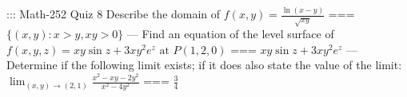 ::: Math-252 Quiz 8
Describe the domain of
\(f(x,y)=\frac{\ln(x-y)}{\sqrt{xy}}\)
===
\(\{(x,y):x>y,xy>0\}\)
---
Find an equation of the level surface of
\(f(x,y,z)=xy\sin z+3xy^2e^z\text{ at }P(1,2,0)\)
===
\(xy\sin z+3xy^2e^z\)
---
Determine if the following limit exists; if it does also state the value of the
limit:
\(\lim_{(x,y)\to(2,1)}\frac{x^2-xy-2y^2}{x^2-4y^2}\)
===
\(\frac{3}{4}\)

